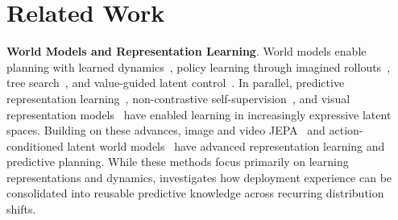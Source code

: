 \section{Related Work}
\label{sec:related}




\noindent \textbf{World Models and Representation Learning}.
World models enable planning with learned dynamics~\cite{watter2015e2c,chua2018pets,hafner2019planet}, policy learning through imagined rollouts~\cite{ha2018worldmodels,kaiser2020simple,micheli2023iris,hafner2020dreamer,hafner2021dreamerv2,hafner2025dreamerv3}, tree search~\cite{schrittwieser2020muzero,ye2021efficientzero}, and value-guided latent control~\cite{hansen2022tdmpc,hansen2024tdmpc2}.
%
In parallel, predictive representation learning~\cite{lecun2022path,oord2018cpc,schwarzer2021spr}, non-contrastive self-supervision~\cite{grill2020byol,zbontar2021barlow,bardes2022vicreg}, and visual representation models~\cite{caron2021dino,oquab2024dinov2,nair2022r3m} have enabled learning in increasingly expressive latent spaces.
%
Building on these advances, image and video JEPA~\cite{assran2023ijepa,bardes2024vjepa,assran2025vjepa2} and action-conditioned latent world models~\cite{zhou2024dinowm,maes2026lewm,wang2026straightening,yin2026ddpwm} have advanced representation learning and predictive planning.
%
While these methods focus primarily on learning representations and dynamics, \ours{} investigates how deployment experience can be consolidated into reusable predictive knowledge across recurring distribution shifts.

